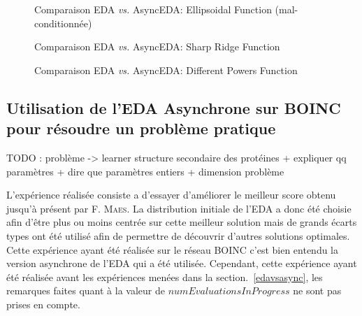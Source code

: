\documentclass[a4paper, 11pt]{report}
\begin{document}
\begin{figure}[!h]
\centering
{}
\label{compare_eda_async_f10}
\caption{Comparaison EDA \textit{vs.} AsyncEDA: Ellipsoidal Function (mal-conditionnée)}
\end{figure}

\begin{figure}[!h]
\centering
{}
\label{compare_eda_async_f13}
\caption{Comparaison EDA \textit{vs.} AsyncEDA: Sharp Ridge Function}
\end{figure}

\begin{figure}[!h]
\centering
{}
\label{compare_eda_async_f14}
\caption{Comparaison EDA \textit{vs.} AsyncEDA: Different Powers Function}
\end{figure}

\subsection{Utilisation de l'EDA Asynchrone sur \textsc{BOINC} pour résoudre un problème pratique}
TODO : problème -> learner structure secondaire des protéines + expliquer qq paramètres + dire que paramètres entiers + dimension problème

L'expérience réalisée consiste a d'essayer d'améliorer le meilleur score obtenu jusqu'à présent par F. \textsc{Maes}. La distribution initiale de l'EDA a donc été choisie afin d'être plus ou moins centrée sur cette meilleur solution mais de grands écarts types ont été utilisé afin de permettre de découvrir d'autres solutions optimales. Cette expérience ayant été réalisée sur le réseau \textsc{BOINC} c'est bien entendu la version asynchrone de l'EDA qui a été utilisée. Cependant, cette expérience ayant été réalisée avant les expériences menées dans la section.~\ref{edavsasync}, les remarques faites quant à la valeur de $numEvaluationsInProgress$  ne sont pas prises en compte.
\end{document}
